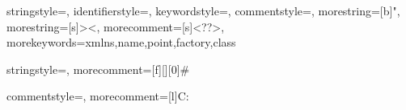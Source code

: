 

{
  stringstyle=\color{black},
  identifierstyle=\color{darkblue},
  keywordstyle=\color{cyan},
  commentstyle=\color{darkgrey}\upshape,
  morestring=[b]",
  morestring=[s]{>}{<},
  morecomment=[s]{<?}{?>},
  morekeywords={xmlns,name,point,factory,class}%
}

{
  stringstyle=\color{black},
  morecomment=[f][\color{darkgrey}\upshape][0]\# %
}

{
  commentstyle=\color{darkblue},
  morecomment=[l]{C:}
}

\fi

\newcommand{\menu}[1]{\textsc{#1} menu}
\newcommand{\key}[1]{$<$\textsc{#1}$>$}
\newcommand{\altkey}[1]{$<$\textsc{alt}$>$+$<$\textsc{#1}$>$}
\newcommand{\ctrlkey}[1]{$<$\textsc{ctrl}$>$+$<$\textsc{#1}$>$}
\newcommand{\ctrlshiftkey}[1]{$<$\textsc{ctrl}$>$+$<$\textsc{shift}$>$+$<$\textsc{#1}$>$}
\newcommand{\contextmenu}[1]{\textsc{#1} context menu}
\newcommand{\button}[1]{\textsc{#1} button}
\newcommand{\tab}[1]{\textsc{#1} tab}
\newcommand{\icon}[1]{\textsc{#1} icon}
\newcommand{\wizard}[1]{\textit{#1} wizard}
\newcommand{\field}[1]{\textit{#1} field}
\newcommand{\outline}[1]{\textit{#1} outline}
\newcommand{\checkbox}[1]{\textit{#1} checkbox}
\newcommand{\node}[1]{\textit{#1} node}
\newcommand{\folder}[1]{\textit{#1} folder}
\newcommand{\link}[1]{\textit{#1} link}
\newcommand{\element}[1]{\textit{#1}}
\newcommand{\property}[1]{\textit{#1} property}
\newcommand{\java}[1]{\texttt{#1}}
\newcommand{\filename}[1]{\path{#1}}


